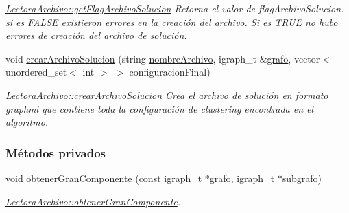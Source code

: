\begin{DoxyCompactItemize}
\begin{DoxyCompactList}\small\item\em \hyperlink{class_lectora_archivo_aa59f0d1c56b4d073e07ec495439738f6}{Lectora\-Archivo\-::get\-Flag\-Archivo\-Solucion} Retorna el valor de flag\-Archivo\-Solucion. si es F\-A\-L\-S\-E existieron errores en la creaci\'{o}n del archivo. Si es T\-R\-U\-E no hubo errores de creaci\'{o}n del archivo de soluci\'{o}n. \end{DoxyCompactList}\item 
void \hyperlink{class_lectora_archivo_a9ec3aa9804dd0469a695b371a4eccfa1}{crear\-Archivo\-Solucion} (string \hyperlink{class_lectora_archivo_ac3cddfb1afc543a82eb72efbc80b501f}{nombre\-Archivo}, igraph\-\_\-t \&\hyperlink{class_lectora_archivo_affd372a364e76c94aa70740f4fa3b744}{grafo}, vector$<$ unordered\-\_\-set$<$ int $>$ $>$ configuracion\-Final)
\begin{DoxyCompactList}\small\item\em \hyperlink{class_lectora_archivo_a9ec3aa9804dd0469a695b371a4eccfa1}{Lectora\-Archivo\-::crear\-Archivo\-Solucion} Crea el archivo de soluci\'{o}n en formato {\itshape graphml} que contiene toda la configuraci\'{o}n de {\itshape clustering} encontrada en el algoritmo. \end{DoxyCompactList}\end{DoxyCompactItemize}
\subsubsection*{Métodos privados}
\begin{DoxyCompactItemize}
\item 
void \hyperlink{class_lectora_archivo_a627952a19595643d18aa43820666ac87}{obtener\-Gran\-Componente} (const igraph\-\_\-t $\ast$\hyperlink{class_lectora_archivo_affd372a364e76c94aa70740f4fa3b744}{grafo}, igraph\-\_\-t $\ast$\hyperlink{class_lectora_archivo_ab04363a5dd47b71aac4922912bf0c9c1}{subgrafo})
\begin{DoxyCompactList}\small\item\em \hyperlink{class_lectora_archivo_a627952a19595643d18aa43820666ac87}{Lectora\-Archivo\-::obtener\-Gran\-Componente}. \end{DoxyCompactList}\end{DoxyCompactItemize}
